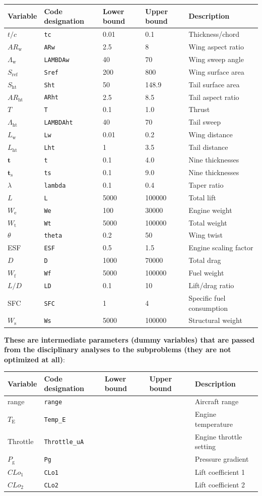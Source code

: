 \documentclass[11pt]{article}
\begin{document}
\begin{longtable}[]{@{}lllll@{}}
\toprule
Variable & Code designation & Lower bound & Upper bound &
Description\tabularnewline
\midrule
\endhead
\(t/c\) & \texttt{tc} & 0.01 & 0.1 & Thickness/chord\tabularnewline
\(AR_{\text{w}}\) & \texttt{ARw} & 2.5 & 8 & Wing aspect
ratio\tabularnewline
\(\Lambda_{\text{w}}\) & \texttt{LAMBDAw} & 40 & 70 & Wing sweep
angle\tabularnewline
\(S_{\text{ref}}\) & \texttt{Sref} & 200 & 800 & Wing surface
area\tabularnewline
\(S_{\text{ht}}\) & \texttt{Sht} & 50 & 148.9 & Tail surface
area\tabularnewline
\(AR_{\text{ht}}\) & \texttt{ARht} & 2.5 & 8.5 & Tail aspect
ratio\tabularnewline
\(T\) & \texttt{T} & 0.1 & 1.0 & Thrust\tabularnewline
\(\Lambda_\text{ht}\) & \texttt{LAMBDAht} & 40 & 70 & Tail
sweep\tabularnewline
\(L_{\text{w}}\) & \texttt{Lw} & 0.01 & 0.2 & Wing
distance\tabularnewline
\(L_{\text{ht}}\) & \texttt{Lht} & 1 & 3.5 & Tail
distance\tabularnewline
\(\mathbf{t}\) & \texttt{t} & 0.1 & 4.0 & Nine
thicknesses\tabularnewline
\(\mathbf{t}_{\text{s}}\) & \texttt{ts} & 0.1 & 9.0 & Nine
thicknesses\tabularnewline
\(\lambda\) & \texttt{lambda} & 0.1 & 0.4 & Taper ratio\tabularnewline
\(L\) & \texttt{L} & 5000 & 100000 & Total lift\tabularnewline
\(W_{\text{e}}\) & \texttt{We} & 100 & 30000 & Engine
weight\tabularnewline
\(W_{\text{t}}\) & \texttt{Wt} & 5000 & 100000 & Total
weight\tabularnewline
\(\theta\) & \texttt{theta} & 0.2 & 50 & Wing twist\tabularnewline
ESF & \texttt{ESF} & 0.5 & 1.5 & Engine scaling factor\tabularnewline
\(D\) & \texttt{D} & 1000 & 70000 & Total drag\tabularnewline
\(W_{\text{f}}\) & \texttt{Wf} & 5000 & 100000 & Fuel
weight\tabularnewline
\(L/D\) & \texttt{LD} & 0.1 & 10 & Lift/drag ratio\tabularnewline
SFC & \texttt{SFC} & 1 & 4 & Specific fuel consumption\tabularnewline
\(W_{\text{s}}\) & \texttt{Ws} & 5000 & 100000 & Structural
weight\tabularnewline
\bottomrule
\end{longtable}

\textbf{These are intermediate parameters (dummy variables) that are
passed from the disciplinary analyses to the subproblems (they are not
optimized at all)}:

\begin{longtable}[]{@{}lllll@{}}
\toprule
Variable & Code designation & Lower bound & Upper bound &
Description\tabularnewline
\midrule
\endhead
range & \texttt{range} & & & Aircraft range\tabularnewline
\(T_{\text{E}}\) & \texttt{Temp\_E} & & & Engine
temperature\tabularnewline
Throttle & \texttt{Throttle\_uA} & & & Engine throttle
setting\tabularnewline
\(P_{\text{g}}\) & \texttt{Pg} & & & Pressure gradient\tabularnewline
\(CLo_{1}\) & \texttt{CLo1} & & & Lift coefficient 1\tabularnewline
\(CLo_{2}\) & \texttt{CLo2} & & & Lift coefficient 2\tabularnewline
\bottomrule
\end{longtable}
\end{document}
